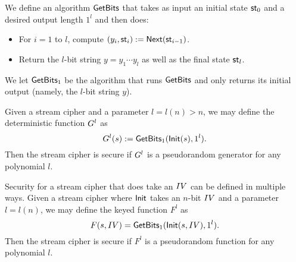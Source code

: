 We define an algorithm $\textsf{GetBits}$ that takes as input an initial state $\textsf{st}_0$
and a desired output length $1^l$ and then does:
\begin{itemize}
  \item For $i = 1$ to $l$, compute $(y_i,\textsf{st}_i) := \textsf{Next}(\textsf{st}_{i - 1})$.
  \item Return the $l$-bit string $y = y_1 \cdots y_l$ as well as the final
        state $\textsf{st}_l$.
\end{itemize}
We let $\textsf{GetBits}_1$ be the algorithm that runs $\textsf{GetBits}$ and only returns
its initial output (namely, the $l$-bit string $y$).


Given a stream cipher and a parameter $l = l(n) > n$, we may define the
deterministic function $G^l$ as
\begin{equation}
  G^l(s) := \textsf{GetBits}_1(\textsf{Init}(s), 1^l).
\end{equation}
Then the stream cipher is secure if $G^l$ is a pseudorandom generator for
any polynomial $l$.


Security for a stream cipher that does take an $IV$ can be defined in multiple
ways. Given a stream cipher where $\textsf{Init}$ takes an $n$-bit $IV$ and a
parameter $l = l(n)$, we may define the keyed function $F^l$ as
\begin{equation}
  F(s, IV) = \textsf{GetBits}_1(\textsf{Init}(s, IV), 1^l).
\end{equation}
Then the stream cipher is secure if $F^l$ is a pseudorandom function for any
polynomial $l$.



